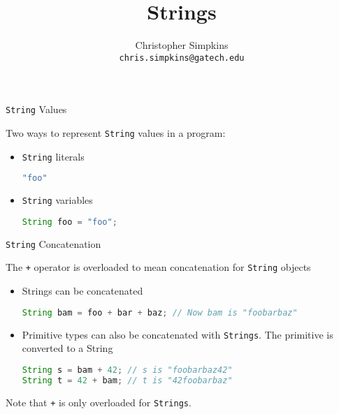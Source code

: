 \documentclass{beamer}
\title[CS 1331 Introduction to Object-Oriented Programming] %
{Strings}
\subtitle{}
\author[Chris Simpkins] %
{Christopher Simpkins \\\texttt{chris.simpkins@gatech.edu}}
\institute[Georgia Tech] %
\date[] %
{}
\begin{document}
\begin{frame}
  \titlepage
\end{frame}

\begin{frame}[fragile]{{\tt String} Values}

Two ways to represent {\tt String} values in a program:
\begin{itemize}

\item {\tt String} literals
\begin{lstlisting}[language=Java]
"foo"
\end{lstlisting}

\item {\tt String} variables

\begin{lstlisting}[language=Java]
String foo = "foo";
\end{lstlisting}

 
\end{itemize}
\end{frame}


\begin{frame}[fragile]{{\tt String} Concatenation }

The {\tt +} operator is overloaded to mean concatenation for {\tt String} objects

\begin{itemize}

\item Strings can be concatenated
\begin{lstlisting}[language=Java]
String bam = foo + bar + baz; // Now bam is "foobarbaz"
\end{lstlisting}

\item Primitive types can also be concatenated with {\tt Strings}.  The primitive is converted to a String
\begin{lstlisting}[language=Java]
String s = bam + 42; // s is "foobarbaz42"
String t = 42 + bam; // t is "42foobarbaz"
\end{lstlisting}

\end{itemize}

Note that {\tt +} is only overloaded for {\tt Strings}.

\end{frame}
\end{document}
